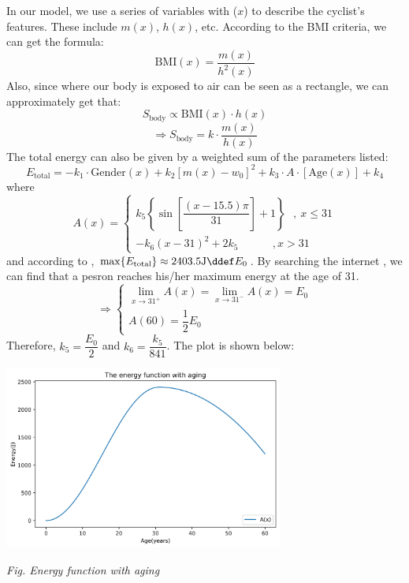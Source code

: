 \documentclass{article}
\begin{document}
			In our model, we use a series of variables with (\(x\)) to describe the cyclist's features. These include $m( x )$, $ h ( x )$, etc. According to the BMI criteria, we can get the formula:
			$$\mathrm{BMI}( x )=\dfrac{m( x )}{ h ^2( x )}$$
			Also, since where our body is exposed to air can be seen as a rectangle, we can approximately get that:
			\[S_{\mathrm{body}} \propto \mathrm{BMI}(x)\cdot h(x)\]
			\[\Rightarrow S_{\mathrm{body}}=k\cdot \dfrac{m(x)}{h(x)}\]
			The total energy can also be given by a weighted sum of the parameters listed:
			\[E_{\mathrm{total}}=-k_1\cdot\mathrm{Gender}(x)+k_2[m(x)-w_0]^2+k_3\cdot A\cdot [\mathrm{Age}(x)]+k_4\]
			where
			\[A(x)=
				\begin{cases}
					k_5\left\{\sin\left[\dfrac{(x-15.5)\pi}{31 }\right]+1\right\}~~~,~x\leq 31 \\
					-k_6 (x-31)^2+2k_5~~~~~~~~~~~~~~,x>31
				\end{cases}
			\]
			and according to \cite{114514}, \(\max\{E_{\mathrm{total}}\}\approx 2403.5 \mathrm{J}\ddef E_{0}\). By searching the internet \cite{energy curve}, we can find that a pesron reaches his/her maximum energy at the age of 31.
			\[
				\Rightarrow
				\begin{cases}
					\lim\limits_{x\rightarrow 31^+} A\left( x \right) =\lim\limits_{x\rightarrow 31^-} A\left( x \right)=E_0 \\
					A(60)=\dfrac 12 E_0
				\end{cases}
			\]
			Therefore, \(k_5 = \dfrac{E_0}{2}\) and \(k_6=\dfrac{k_5}{841}\). The plot is shown below:
			\begin{center}
				\includegraphics[height = 6cm]{energy function with aging.png}

				\small\textit{Fig. Energy function with aging}
			\end{center}

\end{document}
